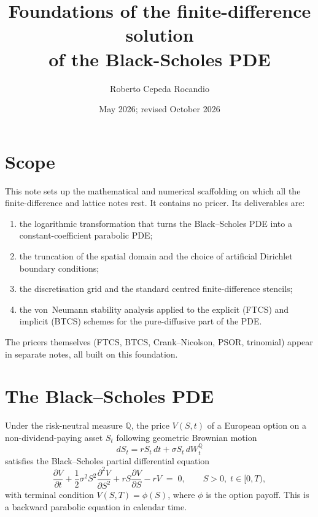 \documentclass[11pt,a4paper]{article}
\title{Foundations of the finite-difference solution\\of the Black-Scholes PDE}
\author{Roberto Cepeda Rocandio}
\date{May 2026; revised October 2026}
\begin{document}
\maketitle

\section{Scope}

This note sets up the mathematical and numerical scaffolding on which
all the finite-difference and lattice notes rest. It contains no pricer. Its deliverables are:
\begin{enumerate}[leftmargin=2em]
\item the logarithmic transformation that turns the Black--Scholes PDE
      into a constant-coefficient parabolic PDE;
\item the truncation of the spatial domain and the choice of artificial
      Dirichlet boundary conditions;
\item the discretisation grid and the standard centred finite-difference
      stencils;
\item the von~Neumann stability analysis applied to the explicit (FTCS)
      and implicit (BTCS) schemes for the pure-diffusive part of the PDE.
\end{enumerate}
The pricers themselves (FTCS, BTCS, Crank--Nicolson, PSOR, trinomial)
appear in separate notes, all built on this foundation.

\section{The Black--Scholes PDE}

Under the risk-neutral measure $\mathbb{Q}$, the price $V(S,t)$ of a
European option on a non-dividend-paying asset $S_t$ following geometric
Brownian motion
\[
dS_t = r S_t\, dt + \sigma S_t\, dW_t^{\mathbb{Q}}
\]
satisfies the Black--Scholes partial differential equation
\begin{equation}
\frac{\partial V}{\partial t}
+ \frac{1}{2}\sigma^2 S^2 \frac{\partial^2 V}{\partial S^2}
+ r S \frac{\partial V}{\partial S}
- r V \;=\; 0,
\qquad S > 0,\; t \in [0,T),
\label{eq:BS}
\end{equation}
with terminal condition $V(S,T) = \phi(S)$, where $\phi$ is the option
payoff. This is a backward parabolic equation in calendar time.
\end{document}
